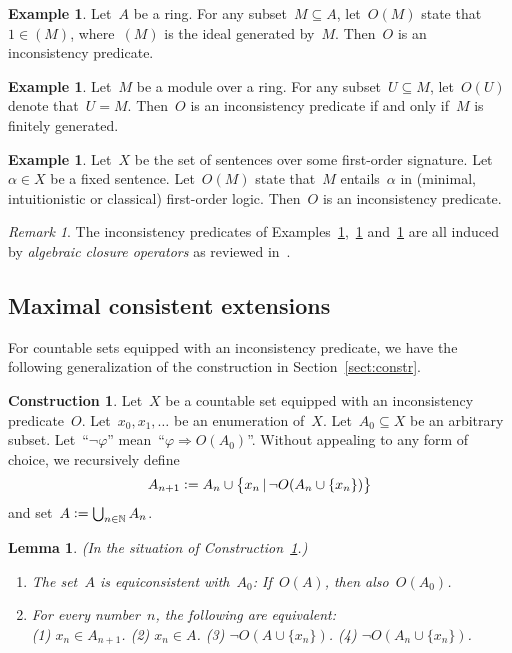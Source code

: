 \documentclass[com,11pt,crcready]{iosart2x}
\theoremstyle{definition}
\newtheorem{construction}{Construction}[section]
\newtheorem{example}[definition]{Example}
\theoremstyle{plain}
\newtheorem{lemma}[definition]{Lemma}
\theoremstyle{remark}
\newtheorem{remark}[definition]{Remark}
\newcommand{\?}{\,{:}\,}
\newcommand{\NN}{\mathbb{N}}
\newcommand{\defeq}{\vcentcolon=}
\renewcommand{\_}{\mathpunct{.}\,}
\begin{document}
\begin{example}\label{ex:inc-ring}Let~$A$ be a ring. For any subset~$M \subseteq A$, let~$O(M)$
state that~$1 \in (M)$, where~$(M)$ is the ideal generated by~$M$. Then~$O$ is an
inconsistency predicate.\end{example}

\begin{example}\label{ex:inc-module}Let~$M$ be a module over a ring. For any subset~$U \subseteq M$,
let~$O(U)$ denote that~$U = M$. Then~$O$ is an inconsistency predicate if and
only if~$M$ is finitely generated.\end{example}

\begin{example}\label{ex:inc-formulas}Let~$X$ be the set of sentences over some first-order
signature. Let~$\alpha \in X$ be a fixed sentence. Let~$O(M)$ state that~$M$
entails~$\alpha$ in (minimal, intuitionistic or classical) first-order logic. Then~$O$ is an inconsistency
predicate.\end{example}

\begin{remark}The inconsistency predicates of
Examples~\ref{ex:inc-ring},~\ref{ex:inc-module} and~\ref{ex:inc-formulas} are
all induced by \emph{algebraic closure operators} as reviewed
in~\cite[Example~1]{wessel-schuster:radical}.\end{remark}


\subsection{Maximal consistent extensions}

For countable sets equipped with an inconsistency predicate, we have the
following generalization of the construction in Section~\ref{sect:constr}.

\begin{construction}\label{constr:inc}Let~$X$ be a countable set equipped with
an inconsistency predicate~$O$. Let~$x_0,x_1,\ldots$ be an enumeration of~$X$.
Let~$A_0 \subseteq X$ be an arbitrary subset. Let~``$\neg\varphi$''
mean~``$\varphi \Rightarrow O(A_0)$''. Without appealing to any form of choice,
we recursively define
\[ A_{n+1} \defeq A_n \cup \bigl\{ x_n \,|\, \neg O(A_n\cup\{x_n\}) \bigr\} \]
and set~$A \defeq \bigcup_{n \in \NN} A_n$.
\end{construction}

\begin{lemma}\label{lemma:omnibus-inc}(In the situation of
Construction~\ref{constr:inc}.)
\begin{enumerate}
\item[(a)] The set~$A$ is equiconsistent with~$A_0$: If~$O(A)$, then also~$O(A_0)$.
\item[(b)] For every number~$n$, the following are equivalent: \\
(1) $x_n \in A_{n+1}$. \quad
(2) $x_n \in A$. \quad
(3) $\neg O(A\cup\{x_n\})$. \quad
(4) $\neg O(A_n \cup \{x_n\})$.
\end{enumerate}\end{lemma}
\end{document}
